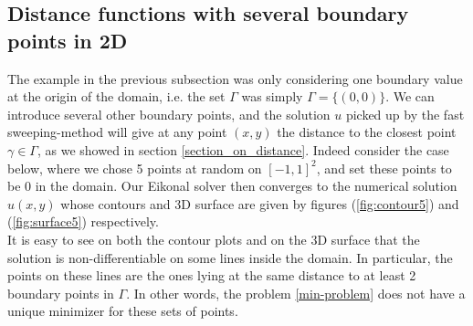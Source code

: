 \documentclass[11pt]{article}
\theoremstyle{definition}
\theoremstyle{remark}
\begin{document}
\subsection{Distance functions with several boundary points in 2D}
The example in the previous subsection was only considering one boundary value at the origin of the domain, i.e. the set $\Gamma$ was simply $\Gamma=\{(0,0)\}$. We can introduce several other boundary points, and the solution $u$ picked up by the fast sweeping-method will give at any point $(x,y)$ the distance to the closest point $\gamma\in\Gamma$, as we showed in section \ref{section_on_distance}. Indeed consider the case below, where we chose 5 points at random on $[-1,1]^2$, and set these points to be 0 in the domain. Our Eikonal solver then converges to the numerical solution $u(x,y)$ whose contours and 3D surface are given by figures (\ref{fig:contour5}) and (\ref{fig:surface5}) respectively. \\
It is easy to see on both the contour plots and on the 3D surface that the solution is non-differentiable on some lines inside the domain. In particular, the points on these lines are the ones lying at the same distance to at least 2 boundary points in $\Gamma$. In other words, the problem \ref{min-problem} does not have a unique minimizer for these sets of points.

\vspace{5pt}
\end{document}
